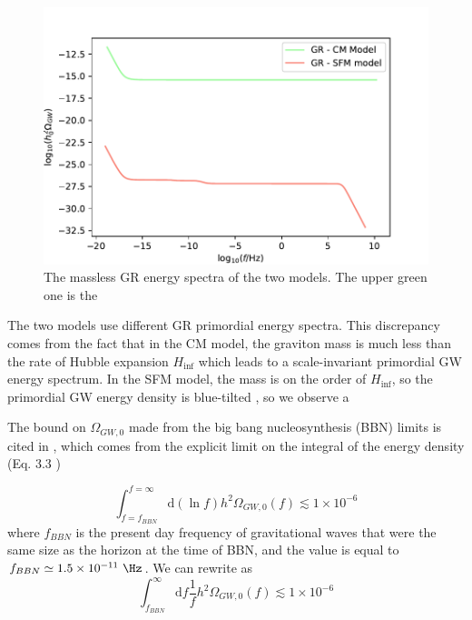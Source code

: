 \begin{figure}[h]
    \centering
    \includegraphics[width=\linewidth]{fig/fig5.pdf} 
    \caption{The massless GR energy spectra of the two models. The upper green one is the  }
\end{figure}
The two models use different GR primordial energy spectra. This discrepancy comes from the fact that in the CM model, the graviton mass is much less than the rate of Hubble expansion $H_{\inf}$ which leads to a scale-invariant primordial GW energy spectrum. In the SFM model, the mass is on the order of $H_{\inf}$, so the primordial GW energy density is blue-tilted \cite{Fujita:2018}, so we observe a  

The bound on $\Omega_{GW,0}$ made from the big bang nucleosynthesis (BBN) limits is cited in \cite{Fujita:2018}, which comes from the explicit limit on the integral of the energy density (Eq. 3.3 \cite{Tanin:2021}) 

\begin{equation} \label{eq:1}
    \int_{f = f_{BBN}}^{f = \infty}\mbox{d}(\ln{f}) h^2\Omega_{GW,0}(f) \lesssim 1\times 10^{-6}
\end{equation} 
where $f_{BBN}$ is the present day frequency of gravitational waves that were the same size as the horizon at the time of BBN, and the value is equal to $f_{BBN} \simeq 1.5\times 10^{-11} \ \Hz$. We can rewrite  as 
\begin{equation} \label{eq:11}
    \int_{f_{BBN}}^{\infty}\mbox{d}f \frac{1}{f} h^2\Omega_{GW,0}(f) \lesssim 1\times 10^{-6}
\end{equation} 